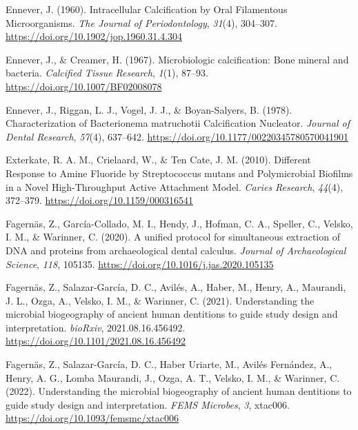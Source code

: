 \documentclass[
  letterpaper,
]{book}
\newlength{\cslhangindent}
\newlength{\cslentryspacingunit} %
\newenvironment{CSLReferences}[2] %
 {%
  \setlength{\parindent}{0pt}
  \ifodd #1
  \let\oldpar\par
  \def\par{\hangindent=\cslhangindent\oldpar}
  \fi
  \setlength{\parskip}{#2\cslentryspacingunit}
 }%
 {}
\begin{document}
\begin{CSLReferences}{1}{0}
\leavevmode{}%
Ennever, J. (1960). Intracellular {Calcification} by {Oral Filamentous
Microorganisms}. \emph{The Journal of Periodontology}, \emph{31}(4),
304--307. \url{https://doi.org/10.1902/jop.1960.31.4.304}

\leavevmode{}%
Ennever, J., \& Creamer, H. (1967). Microbiologic calcification: {Bone}
mineral and bacteria. \emph{Calcified Tissue Research}, \emph{1}(1),
87--93. \url{https://doi.org/10.1007/BF02008078}

\leavevmode{}%
Ennever, J., Riggan, L. J., Vogel, J. J., \& Boyan-Salyers, B. (1978).
Characterization of {Bacterionema} matruchotii {Calcification
Nucleator}. \emph{Journal of Dental Research}, \emph{57}(4), 637--642.
\url{https://doi.org/10.1177/00220345780570041901}

\leavevmode{}%
Exterkate, R. A. M., Crielaard, W., \& Ten Cate, J. M. (2010). Different
{Response} to {Amine Fluoride} by {Streptococcus} mutans and
{Polymicrobial Biofilms} in a {Novel High-Throughput Active Attachment
Model}. \emph{Caries Research}, \emph{44}(4), 372--379.
\url{https://doi.org/10.1159/000316541}

\leavevmode{}%
Fagernäs, Z., García-Collado, M. I., Hendy, J., Hofman, C. A., Speller,
C., Velsko, I. M., \& Warinner, C. (2020). A unified protocol for
simultaneous extraction of {DNA} and proteins from archaeological dental
calculus. \emph{Journal of Archaeological Science}, \emph{118}, 105135.
\url{https://doi.org/10.1016/j.jas.2020.105135}

\leavevmode{}%
Fagernäs, Z., Salazar-García, D. C., Avilés, A., Haber, M., Henry, A.,
Maurandi, J. L., Ozga, A., Velsko, I. M., \& Warinner, C. (2021).
Understanding the microbial biogeography of ancient human dentitions to
guide study design and interpretation. \emph{bioRxiv},
2021.08.16.456492. \url{https://doi.org/10.1101/2021.08.16.456492}

\leavevmode{}%
Fagernäs, Z., Salazar-García, D. C., Haber Uriarte, M., Avilés
Fernández, A., Henry, A. G., Lomba Maurandi, J., Ozga, A. T., Velsko, I.
M., \& Warinner, C. (2022). Understanding the microbial biogeography of
ancient human dentitions to guide study design and interpretation.
\emph{FEMS Microbes}, \emph{3}, xtac006.
\url{https://doi.org/10.1093/femsmc/xtac006}


\end{CSLReferences}
\end{document}
